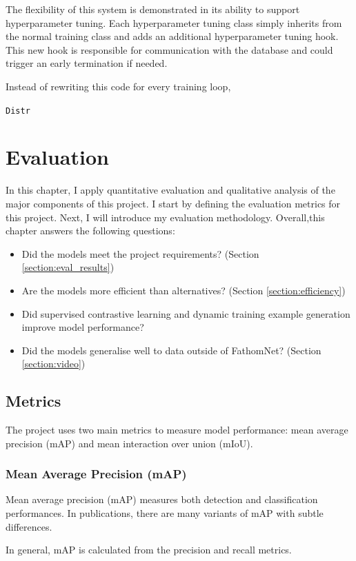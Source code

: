 \documentclass[12pt,a4paper,twoside,openany]{report}
\begin{document}
The flexibility of this system is demonstrated in its ability to support hyperparameter tuning. Each hyperparameter tuning class simply inherits from the normal training class and adds an additional hyperparameter tuning hook. This new hook is responsible for communication with the database and could trigger an early termination if needed. 

Instead of rewriting this code for every training loop, 


\verb|Distr|


\chapter{Evaluation}

In this chapter, I apply quantitative evaluation and qualitative analysis of the major components of this project. I start by defining the evaluation metrics for this project. Next, I will introduce my evaluation methodology. Overall,this chapter answers the following questions:

\begin{itemize}
    \item Did the models meet the project requirements? (Section \ref{section:eval_results})
    \item Are the models more efficient than alternatives? (Section \ref{section:efficiency})
    \item Did supervised contrastive learning and dynamic training example generation improve model performance?
    \item Did the models generalise well to data outside of FathomNet? (Section \ref{section:video})
\end{itemize}


\section{Metrics}
The project uses two main metrics to measure model performance: mean average precision (mAP) and mean interaction over union (mIoU). 

\subsection{Mean Average Precision (mAP)} \label{section:define_mAP}
Mean average precision (mAP) measures both detection and classification performances. In publications, there are many variants of mAP with subtle differences.

In general, mAP is calculated from the precision and recall metrics. 
\end{document}
